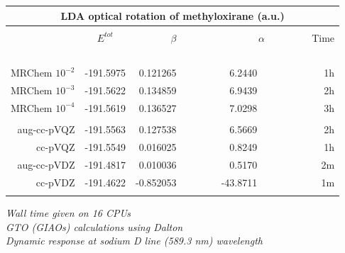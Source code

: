 \begin{frame}
\begin{table}
\centering
\begin{tabular}{r|c|rrr}
\multicolumn{5}{c}{\textbf{LDA optical rotation of methyloxirane (a.u.)}}\\
\hline
\hline
	             &               &                       &                           &               \\
                     &$E^{tot}$      
                     &\multicolumn{1}{c}{$\beta$}
                     &\multicolumn{1}{c}{$\alpha$}
                     &Time           \\
    \hspace{20mm}\   &\hspace{20mm}\ &\hspace{20mm}\         &\hspace{20mm}\             &\hspace{5mm}\ \\
    MRChem $10^{-2}$ & -191.5975     & 0.121265\ \ \ \ \ \ \ &   6.2440\ \ \ \ \ \ \ \ \ &    1h         \\
    MRChem $10^{-3}$ & -191.5622     & 0.134859\ \ \ \ \ \ \ &   6.9439\ \ \ \ \ \ \ \ \ &    2h         \\
    MRChem $10^{-4}$ & -191.5619     & 0.136527\ \ \ \ \ \ \ &   7.0298\ \ \ \ \ \ \ \ \ &    3h         \\
	             &               &                       &                           &               \\
    aug-cc-pVQZ      & -191.5563     & 0.127538\ \ \ \ \ \ \ &   6.5669\ \ \ \ \ \ \ \ \ &    2h         \\
	cc-pVQZ      & -191.5549     & 0.016025\ \ \ \ \ \ \ &   0.8249\ \ \ \ \ \ \ \ \ &    1h         \\
    aug-cc-pVDZ      & -191.4817     & 0.010036\ \ \ \ \ \ \ &   0.5170\ \ \ \ \ \ \ \ \ &    2m         \\
	cc-pVDZ      & -191.4622     &-0.852053\ \ \ \ \ \ \ & -43.8711\ \ \ \ \ \ \ \ \ &    1m         \\
	             &               &                       &                           &               \\
\hline
\hline
\end{tabular}
\end{table}

\centering
\scriptsize
\it{Wall time given on 16 CPUs}\\
\it{GTO (GIAOs) calculations using Dalton}\\
\it{Dynamic response at sodium D line (589.3 nm) wavelength}

\end{frame}


